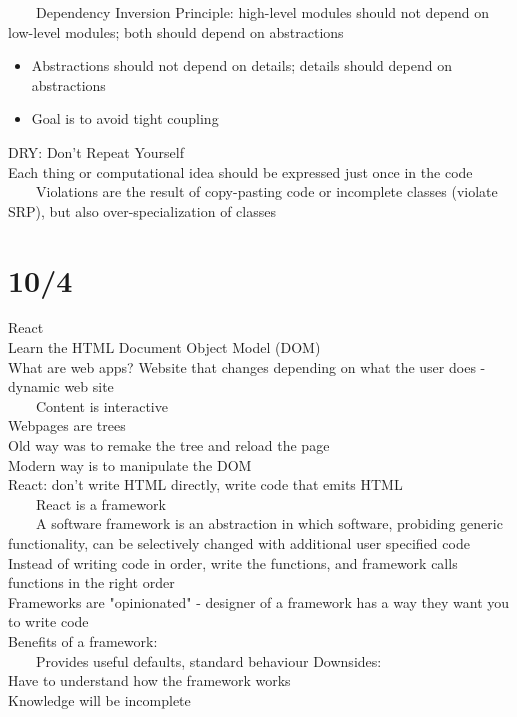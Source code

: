 \documentclass[10pt,letterpaper,unboxed,cm]{article}
\newcommand{\tab}{~~~~}
\begin{document}
\tab Dependency Inversion Principle: high-level modules should not depend on low-level modules; both should depend on abstractions
\begin{itemize}
    \item Abstractions should not depend on details; details should depend on abstractions
    \item Goal is to avoid tight coupling
\end{itemize}
DRY: Don't Repeat Yourself\\
Each thing or computational idea should be expressed just once in the code\\
\tab Violations are the result of copy-pasting code or incomplete classes (violate SRP), but also over-specialization of classes\\
\section{10/4}
React\\
Learn the HTML Document Object Model (DOM)\\
What are web apps? Website that changes depending on what the user does - dynamic web site\\
\tab Content is interactive\\
Webpages are trees\\
Old way was to remake the tree and reload the page\\
Modern way is to manipulate the DOM\\
React: don't write HTML directly, write code that emits HTML\\
\tab React is a framework\\
\tab A software framework is an abstraction in which software, probiding generic functionality, can be selectively changed with additional user specified code\\
Instead of writing code in order, write the functions, and framework calls functions in the right order\\
Frameworks are "opinionated" - designer of a framework has a way they want you to write code\\
Benefits of a framework: \\
\tab Provides useful defaults, standard behaviour
Downsides: \\
Have to understand how the framework works\\
Knowledge will be incomplete\\
\end{document}

